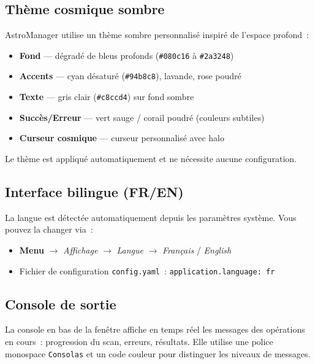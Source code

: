 \documentclass[a4paper,11pt]{article}
\begin{document}
\subsection{Th\`{e}me cosmique sombre}

AstroManager utilise un th\`{e}me sombre personnalis\'{e} inspir\'{e} de l'espace profond~:

\begin{itemize}
    \item \textbf{Fond} --- d\'{e}grad\'{e} de bleus profonds (\texttt{\#080c16} \`{a} \texttt{\#2a3248})
    \item \textbf{Accents} --- cyan d\'{e}satur\'{e} (\texttt{\#94b8c8}), lavande, rose poudr\'{e}
    \item \textbf{Texte} --- gris clair (\texttt{\#c8ccd4}) sur fond sombre
    \item \textbf{Succ\`{e}s/Erreur} --- vert sauge / corail poudr\'{e} (couleurs subtiles)
    \item \textbf{Curseur cosmique} --- curseur personnalis\'{e} avec halo
\end{itemize}

Le th\`{e}me est appliqu\'{e} automatiquement et ne n\'{e}cessite aucune configuration.

\subsection{Interface bilingue (FR/EN)}

La langue est d\'{e}tect\'{e}e automatiquement depuis les param\`{e}tres syst\`{e}me. Vous pouvez la changer via~:

\begin{itemize}
    \item \textbf{Menu} $\rightarrow$ \textit{Affichage} $\rightarrow$ \textit{Langue} $\rightarrow$ \textit{Fran\c{c}ais} / \textit{English}
    \item Fichier de configuration \texttt{config.yaml}~: \texttt{application.language: fr}
\end{itemize}

\subsection{Console de sortie}

La console en bas de la fen\^{e}tre affiche en temps r\'{e}el les messages des op\'{e}rations en cours~: progression du scan, erreurs, r\'{e}sultats. Elle utilise une police monospace \texttt{Consolas} et un code couleur pour distinguer les niveaux de messages.
\end{document}
